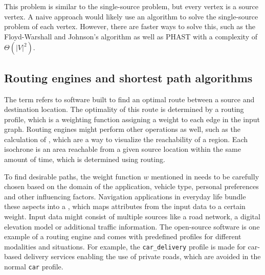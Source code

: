 		\subsubsection{}
		\label{subsubsec:all-pair-shortest-path}
		
			This problem is similar to the single-source problem, but every vertex is a source vertex.
			A naive approach would likely use an algorithm to solve the single-source problem of each vertex.
			However, there are faster ways to solve this, such as the Floyd-Warshall and Johnson's algorithm\cite[693,700]{cormen-introduction-to-alg} as well as PHAST\cite{bast-transportation-networks} with a complexity of $\Theta(|V|^2)$.
		
	\subsection{Routing engines and shortest path algorithms}
	\label{subsec:routing-engines}
		
		The term  refers to software built to find an optimal route between a source and destination location.
		The optimality of this route is determined by a routing profile, which is a weighting function assigning a weight to each edge in the input graph.
		Routing engines might perform other operations as well, such as the calculation of , which are a way to visualize the reachability of a region\cite{allen-isochrones}.
		Each isochrone is an area reachable from a given source location within the same amount of time, which is determined using routing.
		
		To find desirable paths, the weight function $w$ mentioned in  needs to be carefully chosen based on the domain of the application, vehicle type, personal preferences and other influencing factors.
		Navigation applications in everyday life bundle these aspects into a , which maps attributes from the input data to a certain weight.
		Input data might consist of multiple sources like a road network, a digital elevation model or additional traffic information.
		The open-source software  is one example of a routing engine and comes with predefined profiles for different modalities and situations.
		For example, the \texttt{car\_delivery} profile is made for car-based delivery services enabling the use of private roads\cite{graphhopper-routing-profiles}, which are avoided in the normal \texttt{car} profile.
		

